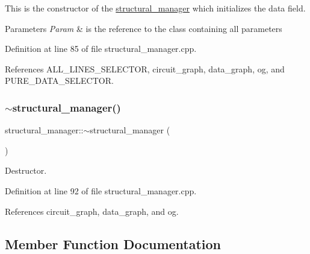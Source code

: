 This is the constructor of the \hyperlink{classstructural__manager}{structural\+\_\+manager} which initializes the data field. 


\begin{DoxyParams}{Parameters}
{\em Param} & is the reference to the class containing all parameters \\
\hline
\end{DoxyParams}


Definition at line 85 of file structural\+\_\+manager.\+cpp.



References A\+L\+L\+\_\+\+L\+I\+N\+E\+S\+\_\+\+S\+E\+L\+E\+C\+T\+OR, circuit\+\_\+graph, data\+\_\+graph, og, and P\+U\+R\+E\+\_\+\+D\+A\+T\+A\+\_\+\+S\+E\+L\+E\+C\+T\+OR.

\mbox{\label{classstructural__manager_a747b18acfc511605b21c6798c089a096}} 
\subsubsection{\texorpdfstring{$\sim$structural\+\_\+manager()}{~structural\_manager()}}
{\footnotesize\ttfamily structural\+\_\+manager\+::$\sim$structural\+\_\+manager (\begin{DoxyParamCaption}{ }\end{DoxyParamCaption})}



Destructor. 



Definition at line 92 of file structural\+\_\+manager.\+cpp.



References circuit\+\_\+graph, data\+\_\+graph, and og.



\subsection{Member Function Documentation}
\mbox{\label{classstructural__manager_a7e4096354c807a693c242cf296ec2d6d}} 
